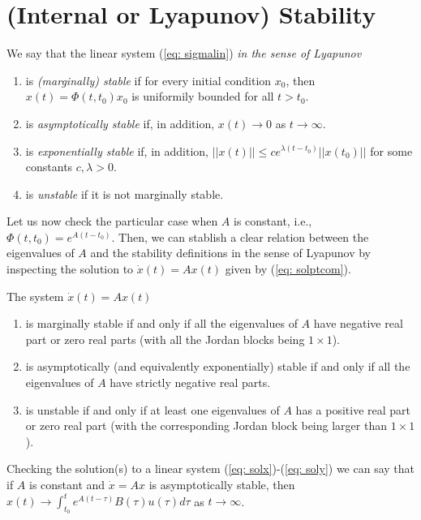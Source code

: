 \section{(Internal or Lyapunov) Stability}
\label{sec: sta}

We say that the linear system (\ref{eq: sigmalin}) \emph{in the sense of Lyapunov}
\begin{enumerate}
	\item is \emph{(marginally) stable} if for every initial condition $x_0$, then $x(t) = \Phi(t,t_0) x_0$ is uniformily bounded for all $t>t_0$.
	\item is \emph{asymptotically stable} if, in addition, $x(t) \to 0$ as $t\to\infty$.
	\item is \emph{exponentially stable} if, in addition, $||x(t)|| \leq c e^{\lambda(t-t_0)}||x(t_0)||$ for some constants $c,\lambda > 0$.
	\item is \emph{unstable} if it is not marginally stable.
\end{enumerate}


Let us now check the particular case when $A$ is constant, i.e., $\Phi(t,t_0) = e^{A(t-t_0)}$. Then, we can stablish a clear relation between the eigenvalues of $A$ and the stability definitions in the sense of Lyapunov by inspecting the solution to $\dot x(t) = Ax(t)$ given by (\ref{eq: solptcom}).


The system $\dot x(t) = Ax(t)$
\begin{enumerate}
	\item is marginally stable if and only if all the eigenvalues of $A$ have negative real part or zero real parts (with all the Jordan blocks being $1\times 1$).
	\item is asymptotically (and equivalently exponentially) stable if and only if all the eigenvalues of $A$ have strictly negative real parts.
	\item is unstable if and only if at least one eigenvalues of $A$ has a positive real part or zero real part (with the corresponding Jordan block being larger than $1\times 1$).
\end{enumerate}

Checking the solution(s) to a linear system (\ref{eq: solx})-(\ref{eq: soly}) we can say that if $A$ is constant and $\dot x = Ax$ is asymptotically stable, then $x(t) \to \int_{t_0}^t e^{A(t-\tau)}B(\tau)u(\tau)d\tau$ as $t\to\infty$. 

